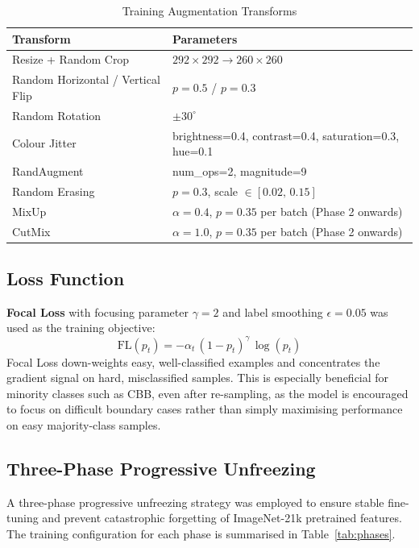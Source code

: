 \documentclass[12pt,a4paper]{article}
\begin{document}
\begin{table}[H]
\centering
\caption{Training Augmentation Transforms}
\label{tab:aug}
\begin{tabular}{|l|l|}
    \hline
    \textbf{Transform} & \textbf{Parameters} \\
    \hline
    Resize + Random Crop & $292\times292 \to 260\times260$ \\
    \hline
    Random Horizontal / Vertical Flip & $p=0.5$ / $p=0.3$ \\
    \hline
    Random Rotation & $\pm30^{\circ}$ \\
    \hline
    Colour Jitter & brightness=0.4, contrast=0.4, saturation=0.3, hue=0.1 \\
    \hline
    RandAugment \cite{randaugment} & num\_ops=2, magnitude=9 \\
    \hline
    Random Erasing & $p=0.3$, scale $\in[0.02,\,0.15]$ \\
    \hline
    MixUp \cite{mixup} & $\alpha=0.4$, $p=0.35$ per batch (Phase 2 onwards) \\
    \hline
    CutMix \cite{cutmix} & $\alpha=1.0$, $p=0.35$ per batch (Phase 2 onwards) \\
    \hline
\end{tabular}
\end{table}

\subsection{Loss Function}

\textbf{Focal Loss} \cite{focalloss} with focusing parameter $\gamma=2$ and label smoothing $\epsilon=0.05$ was used as the training objective:
\[
    \text{FL}(p_t) = -\alpha_t\,(1-p_t)^{\gamma}\,\log(p_t)
\]
Focal Loss down-weights easy, well-classified examples and concentrates the gradient signal on hard, misclassified samples. This is especially beneficial for minority classes such as CBB, even after re-sampling, as the model is encouraged to focus on difficult boundary cases rather than simply maximising performance on easy majority-class samples.

\subsection{Three-Phase Progressive Unfreezing}

A three-phase progressive unfreezing strategy was employed to ensure stable fine-tuning and prevent catastrophic forgetting of ImageNet-21k pretrained features. The training configuration for each phase is summarised in Table~\ref{tab:phases}.
\end{document}
